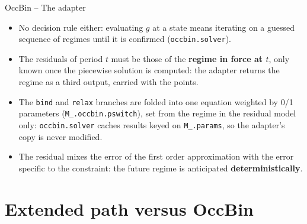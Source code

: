 \documentclass[11pt,aspectratio=169]{beamer}
\newcommand{\code}[1]{\texttt{#1}}
\begin{document}
\begin{frame}{OccBin -- The adapter}

\begin{itemize}

\item No decision rule either: evaluating $g$ at a state means iterating on a guessed sequence of regimes until it is confirmed (\code{occbin.solver}).\newline

\item The residuals of period $t$ must be those of the \textbf{regime in force at $t$}, only known once the piecewise solution is computed: the adapter returns the regime as a third output, carried with the points.\newline

\item The \code{bind} and \code{relax} branches are folded into one equation weighted by 0/1 parameters (\code{M\_.occbin.pswitch}), set from the regime in the residual model only: \code{occbin.solver} caches results keyed on \code{M\_.params}, so the adapter's copy is never modified.\newline

\item The residual mixes the error of the first order approximation with the error specific to the constraint: the future regime is anticipated \textbf{deterministically}.

\end{itemize}

\end{frame}

\section{Extended path versus OccBin}
\end{document}
